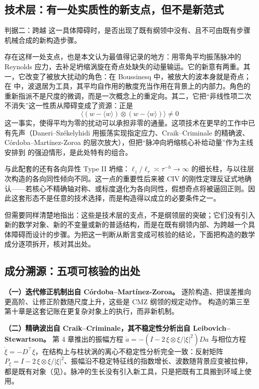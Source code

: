 \subsection{技术层：有一处实质性的新支点，但不是新范式}

判据二：跨越 \NS{} 这一具体障碍时，是否出现了既有纲领中没有、且不可由既有步骤机械合成的新构造步骤。

存在这样一处支点，也是本文认为最值得记录的地方：用零角平均振荡脉冲的 Reynolds 应力，去补足坍缩涡旋在奇点处缺失的动量输运。它的新意有两重。其一，它改变了被放大扰动的角色：在 Boussinesq 中，被放大的波本身就是奇点；在 \NS{} 中，波退居为工具，其平均自作用的散度充当作用在背景上的内部力。角色的重新指派不是尺度的微调，而是一次概念上的重定向。其二，它把“非线性项二次不消失”这一性质从障碍变成了资源：正是
\begin{equation}
\big\langle (w-\langle w\rangle)\otimes(w-\langle w\rangle)\big\rangle\neq 0
\end{equation}
这一事实，使得平均为零的扰动可以承担非零的通量。这项技术在更早的工作中已有先声（Daneri--Székelyhidi 用振荡实现指定应力、Craik--Criminale 的精确波、Córdoba--Martínez-Zoroa 的层次放大），但把“脉冲向坍缩核心补给动量”作为主线安排到 \NS{} 的强迫情形，是此处特有的组合。

与此配套的还有各向异性 Type II 坍缩：$\ell_{z}/\ell_{r}\asymp\tau^{-h}\to\infty$ 的细长柱，与以往层次构造的各向同性倾向不同。这一点的重要性后来被 CIV 的刚性定理反证式地确认——若核心不精确轴对称、或标度退化为各向同性，假想奇点将被逼回正则。因此这套形态不是任意的技术选择，而是构造得以成立的必要条件之一。

但需要同样清楚地指出：这些是技术层的支点，不是纲领层的突破；它们没有引入新的数学对象、新的不变量或新的普适结构，而是在既有纲领内部、为跨越一个具体障碍而设计的步骤。为把这一判断从断言变成可核验的结论，下面把构造的数学成分逐项拆开，核对其出处。

\subsection{成分溯源：五项可核验的出处}

\textbf{（一）迭代修正机制出自 Córdoba--Martínez-Zoroa。} 逐阶构造、把误差推向更高阶、让修正阶数随尺度上升，这些是 CMZ 纲领的规定动作。\NS{} 构造的第三至第十章是这套记账在更复杂对象上的执行，而非新机制。

\textbf{（二）精确波出自 Craik--Criminale，其不稳定性分析出自 Leibovich--Stewartson。} 第 4 章推出的振幅方程 $\dot a=-(I-2\,\xi\otimes\xi/|\xi|^{2})Da$ 与相位方程 $\dot\xi=-D^{\top}\xi$，在结构上与柱状涡的离心不稳定性分析完全一致：反射矩阵 $P_{\xi}=I-2\,\xi\otimes\xi/|\xi|^{2}$、振幅沿不稳定特征线的指数增长、波数随背景应变被拉伸，都是既有对象（见\cite{leibovich,billant}）。脉冲的生长没有引入新工具，只是把既有工具搬到环域上使用。

